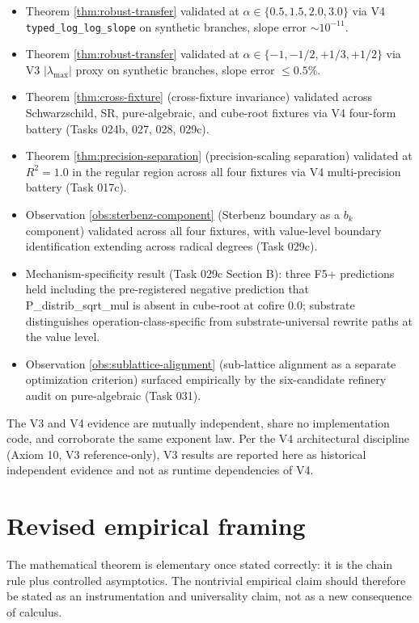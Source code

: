\documentclass[11pt,a4paper]{article}
\begin{document}
\begin{itemize}
    \item Theorem \ref{thm:robust-transfer} validated at $\alpha \in \{0.5, 1.5, 2.0, 3.0\}$ via V4 \texttt{typed\_log\_log\_slope} on synthetic branches, slope error $\sim 10^{-11}$.
    \item Theorem \ref{thm:robust-transfer} validated at $\alpha \in \{-1, -1/2, +1/3, +1/2\}$ via V3 $|\lambda_{\max}|$ proxy on synthetic branches, slope error $\le 0.5\%$.
    \item Theorem \ref{thm:cross-fixture} (cross-fixture invariance) validated across Schwarzschild, SR, pure-algebraic, and cube-root fixtures via V4 four-form battery (Tasks 024b, 027, 028, 029c).
    \item Theorem \ref{thm:precision-separation} (precision-scaling separation) validated at $R^2 = 1.0$ in the regular region across all four fixtures via V4 multi-precision battery (Task 017c).
    \item Observation \ref{obs:sterbenz-component} (Sterbenz boundary as a $b_k$ component) validated across all four fixtures, with value-level boundary identification extending across radical degrees (Task 029c).
    \item Mechanism-specificity result (Task 029c Section B): three F5+ predictions held including the pre-registered negative prediction that P\_distrib\_sqrt\_mul is absent in cube-root at cofire 0.0; substrate distinguishes operation-class-specific from substrate-universal rewrite paths at the value level.
    \item Observation \ref{obs:sublattice-alignment} (sub-lattice alignment as a separate optimization criterion) surfaced empirically by the six-candidate refinery audit on pure-algebraic (Task 031).
\end{itemize}

The V3 and V4 evidence are mutually independent, share no implementation code, and corroborate the same exponent law. Per the V4 architectural discipline (Axiom 10, V3 reference-only), V3 results are reported here as historical independent evidence and not as runtime dependencies of V4.

\section{Revised empirical framing}

The mathematical theorem is elementary once stated correctly: it is the chain rule plus controlled asymptotics. The nontrivial empirical claim should therefore be stated as an instrumentation and universality claim, not as a new consequence of calculus.
\end{document}
